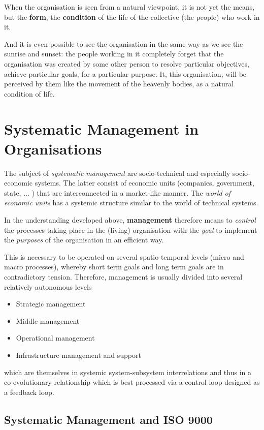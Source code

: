\documentclass[11pt,a4paper]{article}
\begin{document}
When the organisation is seen from a natural viewpoint, it is not yet the
means, but the \textbf{form}, the \textbf{condition} of the life of the
collective (the people) who work in it.

And it is even possible to see the organisation in the same way as we see the
sunrise and sunset: the people working in it completely forget that the
organisation was created by some other person to resolve particular
objectives, achieve particular goals, for a particular purpose. It, this
organisation, will be perceived by them like the movement of the heavenly
bodies, as a natural condition of life.

\section{Systematic Management in Organisations}

The subject of \emph{systematic management} are socio-technical and especially
socio-economic systems. The latter consist of economic units (companies,
government, state, ... ) that are interconnected in a market-like manner. The
\emph{world of economic units} has a systemic structure similar to the world
of technical systems.

In the understanding developed above, \textbf{management} therefore means to
\emph{control} the processes taking place in the (living) organisation with
the \emph{goal} to implement the \emph{purposes} of the organisation in an
efficient way.

This is necessary to be operated on several spatio-temporal levels (micro and
macro processes), whereby short term goals and long term goals are in 
contradictory tension. Therefore, management is usually divided into several
relatively autonomous levels
\begin{itemize}
\item Strategic management
\item Middle management
\item Operational management
\item Infrastructure management and support
\end{itemize}
which are themselves in systemic system-subsystem interrelations and thus in a
co-evolutio\-nary relationship which is best processed via a control loop
designed as a feedback loop.

\subsection{Systematic Management and ISO 9000}
\end{document}
